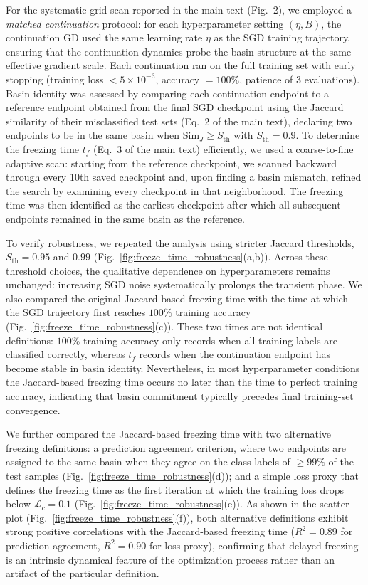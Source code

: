 \documentclass[aps,prx,preprint,superscriptaddress,nofootinbib]{revtex4-2}
\begin{document}
For the systematic grid scan reported in the main text (Fig.~2), we employed a \emph{matched continuation} protocol: for each hyperparameter setting $(\eta, B)$, the continuation GD used the same learning rate $\eta$ as the SGD training trajectory, ensuring that the continuation dynamics probe the basin structure at the same effective gradient scale. Each continuation ran on the full training set with early stopping (training loss $< 5 \times 10^{-3}$, accuracy $= 100\%$, patience of 3 evaluations). Basin identity was assessed by comparing each continuation endpoint to a reference endpoint obtained from the final SGD checkpoint using the Jaccard similarity of their misclassified test sets (Eq.~2 of the main text), declaring two endpoints to be in the same basin when $\mathrm{Sim}_J \ge S_\mathrm{th}$ with $S_\mathrm{th} = 0.9$. To determine the freezing time $t_f$ (Eq.~3 of the main text) efficiently, we used a coarse-to-fine adaptive scan: starting from the reference checkpoint, we scanned backward through every 10th saved checkpoint and, upon finding a basin mismatch, refined the search by examining every checkpoint in that neighborhood. The freezing time was then identified as the earliest checkpoint after which all subsequent endpoints remained in the same basin as the reference.

To verify robustness, we repeated the analysis using stricter Jaccard thresholds, $S_{\mathrm{th}}=0.95$ and $0.99$ (Fig.~\ref{fig:freeze_time_robustness}(a,b)). Across these threshold choices, the qualitative dependence on hyperparameters remains unchanged: increasing SGD noise systematically prolongs the transient phase. We also compared the original Jaccard-based freezing time with the time at which the SGD trajectory first reaches $100\%$ training accuracy (Fig.~\ref{fig:freeze_time_robustness}(c)). These two times are not identical definitions: $100\%$ training accuracy only records when all training labels are classified correctly, whereas $t_f$ records when the continuation endpoint has become stable in basin identity. Nevertheless, in most hyperparameter conditions the Jaccard-based freezing time occurs no later than the time to perfect training accuracy, indicating that basin commitment typically precedes final training-set convergence.

We further compared the Jaccard-based freezing time with two alternative freezing definitions: a prediction agreement criterion, where two endpoints are assigned to the same basin when they agree on the class labels of $\geq 99\%$ of the test samples (Fig.~\ref{fig:freeze_time_robustness}(d)); and a simple loss proxy that defines the freezing time as the first iteration at which the training loss drops below $\mathcal{L}_c = 0.1$ (Fig.~\ref{fig:freeze_time_robustness}(e)). As shown in the scatter plot (Fig.~\ref{fig:freeze_time_robustness}(f)), both alternative definitions exhibit strong positive correlations with the Jaccard-based freezing time ($R^2 = 0.89$ for prediction agreement, $R^2 = 0.90$ for loss proxy), confirming that delayed freezing is an intrinsic dynamical feature of the optimization process rather than an artifact of the particular definition.
\end{document}
